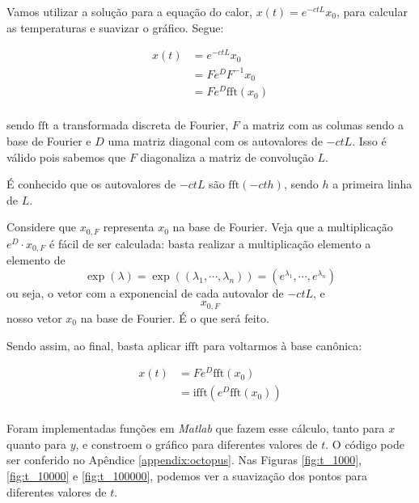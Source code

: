 \documentclass{article}
\begin{document}
\begin{enumerate}
\begin{enumerate}
                        Vamos utilizar a solução para a equação do calor,
                        $x(t) = e^{-c t L} x_0$, para calcular as temperaturas
                        e suavizar o gráfico. Segue:

                        \begin{align*}
                            x(t) &= e^{-c t L} x_0 \\
                            &= F e^{D} F^{-1} x_0 \\
                            &= F e^{D} \textrm{fft}(x_0) \\
                        \end{align*}

                        sendo $\textrm{fft}$ a transformada discreta de Fourier,
                        $F$ a matriz com as colunas sendo a base de Fourier e
                        $D$ uma matriz diagonal com os autovalores de
                        $-ctL$. Isso é válido pois sabemos que $F$ diagonaliza a matriz
                        de convolução $L$.

                        É conhecido que os autovalores de $-ctL$ são $\textrm{fft}(-cth)$,
                        sendo $h$ a primeira linha de $L$. 

                        Considere que $x_{0,F}$ representa $x_0$ na base de Fourier.
                        Veja que a multiplicação $e^D \cdot x_{0, F}$ é fácil de ser calculada:
                        basta realizar a multiplicação elemento a elemento de
                        $$\exp(\lambda) = \exp((\lambda_1, \cdots, \lambda_n)) = \left(e^{\lambda_1}, \cdots, e^{\lambda_n}\right)$$
                        ou seja, o vetor com a exponencial de cada autovalor de $-ctL$, e
                        $$x_{0, F}$$
                        nosso vetor $x_0$ na base de Fourier. É o que será feito.

                        Sendo assim, ao final, basta aplicar $\textrm{ifft}$ para voltarmos
                        à base canônica:

                        \begin{align*}
                            x(t) &= F e^{D} \textrm{fft}(x_0) \\
                            &= \textrm{ifft}\left(e^{D} \textrm{fft}(x_0)\right) \\
                        \end{align*}

                        Foram implementadas funções em \textit{Matlab} que fazem esse cálculo,
                        tanto para $x$ quanto para $y$, e
                        constroem o gráfico para diferentes valores de $t$. O código pode ser conferido no Apêndice \ref{appendix:octopus}.
                        Nas Figuras \ref{fig:t_1000}, \ref{fig:t_10000} e
                        \ref{fig:t_100000}, podemos ver a suavização dos pontos para diferentes valores de $t$.


\end{enumerate}
\end{enumerate}
\end{document}
